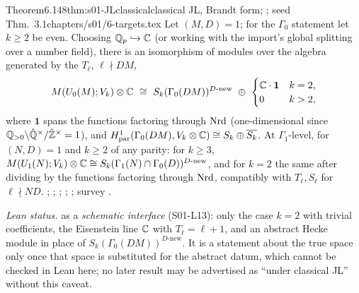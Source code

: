 \begin{quoted}{Theorem}{6.1}{48}{thm:s01-JLclassical}{classical JL, Brandt form; ; seed Thm.~3.1}{chapters/s01/6-targets.tex}\label{rpt:thm:s01-JLclassical}
Let $(M,D)=1$; for the $\Gamma_0$ statement let $k\ge2$ be even. Choosing $\mathbb{Q}_p\hookrightarrow\mathbb{C}$ (or working with the import's global splitting over a number
field), there is an isomorphism of modules over the algebra generated by the $T_\ell$, $\ell\nmid DM$,
\[\Brandt{\Uzero{M}}{V_k}\otimes\C\ \cong\ S_k(\Gamma_0(DM))^{D\text{-new}}\ \oplus\ \begin{cases}\C\cdot\mathbf 1&k=2,\\0&k>2,\end{cases}\]
where $\mathbf 1$ spans the functions factoring through $\mathrm{Nrd}$ (one-dimensional since $\mathbb{Q}_{>0}\backslash\hat{\mathbb{Q}}^\times/\hat{\mathbb{Z}}^\times=1$),
and $H^1_{\rm par}(\Gamma_0(DM),V_k\otimes\mathbb{C})\cong S_k\oplus\overline{S_k}$. At $\Gamma_1$-level, for $(N,D)=1$ and $k\ge2$ of any parity: for $k\ge3$,
$M(U_1(N);V_k)\otimes\mathbb{C}\cong S_k(\Gamma_1(N)\cap\Gamma_0(D))^{D\text{-new}}$, and for $k=2$ the same after dividing
by the functions factoring through $\mathrm{Nrd}$, compatibly with $T_\ell,S_\ell$ for $\ell\nmid ND$.
\stcited{} \cite[Thm.~16.1 (LNM~114, p.~494; p.~250 in the retypeset copy in ) (representation-theoretic; JL call
their proof a sketch)]{JL}; \cite[Thm.~2, p.~13 ($\Gamma_1$ form,
attributed to JL, Shimizu, Arthur)]{Buz04}; \cite[\S0,
p.~280 (basis problem, all $N$)]{HPS80}; \cite[scan; not text-verified]{Shz65};
\cite[scan; not text-verified; algorithmic side]{Piz80};
survey \cite[Remark~41.5.13, p.~778 (historical account of the correspondence; the
statement itself is not formulated there)]{Vo}.
\par\smallskip{}\par
\noindent\emph{Lean status.}  \stformal{} as a \emph{schematic interface} (S01-L13): only the case $k=2$
with trivial coefficients, the Eisenstein line $\mathbb{C}$ with $T_\ell=\ell+1$, and an abstract Hecke module in place of
$S_k(\Gamma_0(DM))^{D\text{-new}}$. It is a statement about the true space only once that space is substituted for the abstract datum, which cannot be checked
in Lean here; no later result may be advertised as ``under classical JL'' without this caveat.
\end{quoted}
